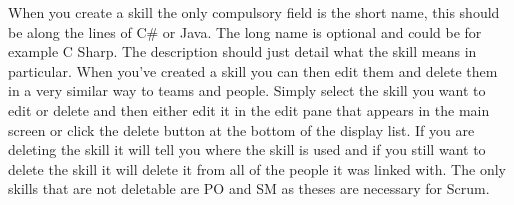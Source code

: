 When you create a skill the only compulsory field is the short name, this should be along the lines of C\# or Java. The long name is optional and could be for example C Sharp. The description should just detail what the skill means in particular.
\newline\newline
When you've created a skill you can then edit them and delete them in a very similar way to teams and people. Simply select the skill you want to edit or delete and then either edit it in the edit pane that appears in the main screen or click the delete button at the bottom of the display list. If you are deleting the skill it will tell you where the skill is used and if you still want to delete the skill it will delete it from all of the people it was linked with. The only skills that are not deletable are PO and SM as theses are necessary for Scrum.